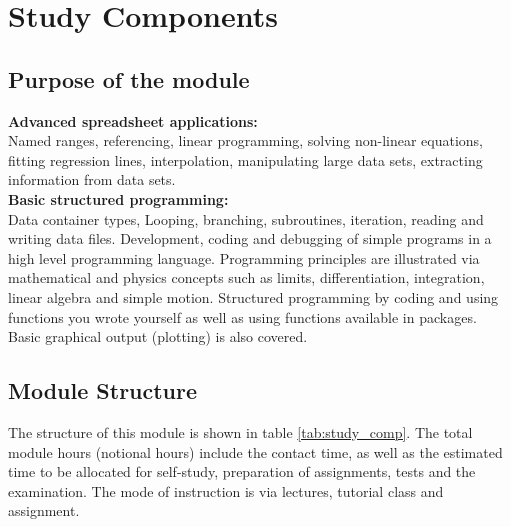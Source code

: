 \section{Study Components}
    \subsection{Purpose of the module}
        {\bf Advanced spreadsheet applications:} \\
        Named ranges, referencing, linear programming, solving non-linear
        equations, fitting regression lines, interpolation, manipulating
        large data sets, extracting information from data sets. \\

        \noindent
        {\bf Basic structured programming:} \\
        Data container types, Looping, branching, subroutines, iteration,
        reading and writing data files. Development, coding and debugging
        of simple programs in a high level programming
        language. Programming principles are illustrated via mathematical
        and physics concepts such as limits, differentiation, integration,
        linear algebra and simple motion. Structured programming by coding
        and using functions you wrote yourself as well as using functions
        available in packages. Basic graphical output (plotting) is also
        covered.

    \subsection{Module Structure}
        The structure of this module is shown in table \ref{tab:study_comp}.
        The total module hours (notional hours) include the contact time,
        as well as the estimated time to be allocated for self-study,
        preparation of assignments, tests and the examination. The mode of
        instruction is via lectures, tutorial class and assignment. \\


